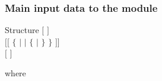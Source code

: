 
\vskip 0.2cm
\subsubsection{Main input data to the  module}\label{sect:mccmain}

\noindent

\begin{DataStructure}{Structure }
$[$   $]$\\
$[[$   $\{$   $|$   $|$ $\{$  $|$  $\}$  $\}$ $]]$ \\
$[$   $]$\\
\end{DataStructure}

\noindent where

